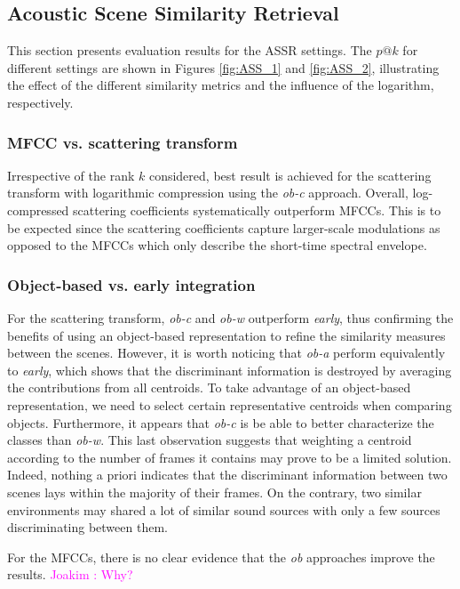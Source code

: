 \documentclass[journal]{IEEEtran}
\makeatletter
\newcommand*{\vs}{vs.\@\xspace}
\newcommand{\ja}[1]{\textcolor{magenta}{Joakim : #1}}
\makeatother
\begin{document}
\subsection{Acoustic Scene Similarity Retrieval}

This section presents evaluation results for the ASSR settings. The $p@k$ for different settings are shown in Figures \ref{fig:ASS_1} and \ref{fig:ASS_2}, illustrating the effect of the different similarity metrics and the influence of the logarithm, respectively.

\subsubsection*{MFCC \vs scattering transform}

Irrespective of the rank $k$ considered, best result is achieved for the scattering transform with logarithmic compression using the \emph{ob-c} approach. Overall, log-compressed scattering coefficients systematically outperform MFCCs. This is to be expected since the scattering coefficients capture larger-scale modulations as opposed to the MFCCs which only describe the short-time spectral envelope.

\subsubsection*{Object-based \vs early integration}

For the scattering transform, \emph{ob-c} and \emph{ob-w} outperform \emph{early}, thus confirming the benefits of using an object-based representation to refine the similarity measures between the scenes. However, it is worth noticing that \emph{ob-a} perform equivalently to \emph{early}, which shows that the discriminant information is destroyed by averaging the contributions from all centroids. To take advantage of an object-based representation, we need to select certain representative centroids when comparing objects. Furthermore, it appears that \emph{ob-c} is be able to better characterize the classes than \emph{ob-w}. This last observation suggests that weighting a centroid according to the number of frames it contains may prove to be a limited solution. Indeed, nothing a priori indicates that the discriminant information between two scenes lays within the majority of their frames. On the contrary, two similar environments may shared a lot of similar sound sources with only a few sources discriminating between them.

For the MFCCs, there is no clear evidence that the \emph{ob} approaches improve the results. \ja{Why?}
\end{document}
